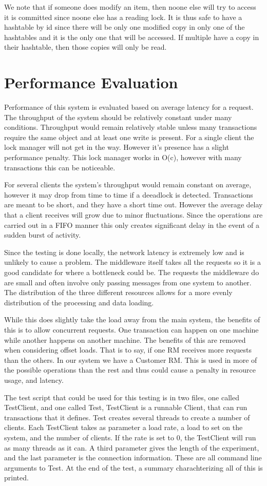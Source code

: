 \documentclass[12pt]{article}
\theoremstyle{plain}%
\theoremstyle{definition}
\theoremstyle{remark}
\begin{document}
We note that if someone does modify an item, then noone else will try to access it is committed since noone else has a reading lock. It is thus safe to have a hashtable by id since there will be only one modified copy in only one of the hashtables and it is the only one that will be accessed. If multiple have a copy in their hashtable, then those copies will only be read.

\section*{Performance Evaluation}
Performance of this system is evaluated based on average latency for a request. The throughput of the system should be relatively constant under many conditions. Throughput would remain relatively stable unless many transactions require the same object and at least one write is present. For a single client the lock manager will not get in the way. However it's presence has a slight performance penalty. This lock manager works in O(c), however with many transactions this can be noticeable. 

For several clients the system's throughput would remain constant on average, however it may drop from time to time if a deeadlock is detected. Transactions are meant to be short, and they have a short time out. However the average delay that a client receives will grow due to minor fluctuations. Since the operations are carried out in a FIFO manner this only creates significant delay in the event of a sudden burst of activity. 

Since the testing is done locally, the network latency is extremely low and is unlikely to cause a problem. The middleware itself takes all the requests so it is a good candidate for where a bottleneck could be. The requests the middleware do are small and often involve only passing messages from one system to another. The distribution of the three different resources allows for a more evenly distribution of the processing and data loading. 

While this does slightly take the load away from the main system, the benefits of this is to allow concurrent requests. One transaction can happen on one machine while another happens on another machine. The benefits of this are removed when considering offset loads. That is to say, if one RM receives more requests than the others. In our system we have a Customer RM. This is used in more of the possible operations than the rest and thus could cause a penalty in resource usage, and latency.  

The test script that could be used for this testing is in two files, one called TestClient, and one called Test, TestClient is a runnable Client, that can run transactions that it defines. Test creates several threads to create a number of clients. Each TestClient takes as parameter a load rate, a load to set on the system, and the number of clients. If the rate is set to 0, the TestClient will run as many threads as it can. A third parameter gives the length of the experiment, and the last parameter is the connection information. These are all command line arguments to Test. At the end of the test, a summary charachterizing all of this is printed.  
\end{document}
